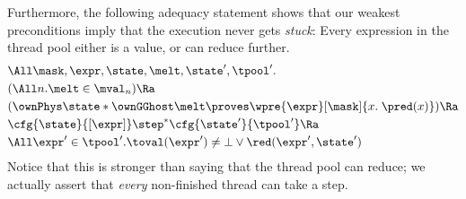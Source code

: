 Furthermore, the following adequacy statement shows that our weakest preconditions imply that the execution never gets \emph{stuck}: Every expression in the thread pool either is a value, or can reduce further.
\begin{align*}
 &\All \mask, \expr, \state, \melt, \state', \tpool'.
 \\&(\All n. \melt \in \mval_n) \Ra
 \\&( \ownPhys\state * \ownGGhost\melt \proves \wpre{\expr}[\mask]{x.\; \pred(x)}) \Ra
 \\&\cfg{\state}{[\expr]} \step^\ast
     \cfg{\state'}{\tpool'} \Ra
     \\&\All\expr'\in\tpool'. \toval(\expr') \neq \bot \lor \red(\expr', \state')
\end{align*}
Notice that this is stronger than saying that the thread pool can reduce; we actually assert that \emph{every} non-finished thread can take a step.


